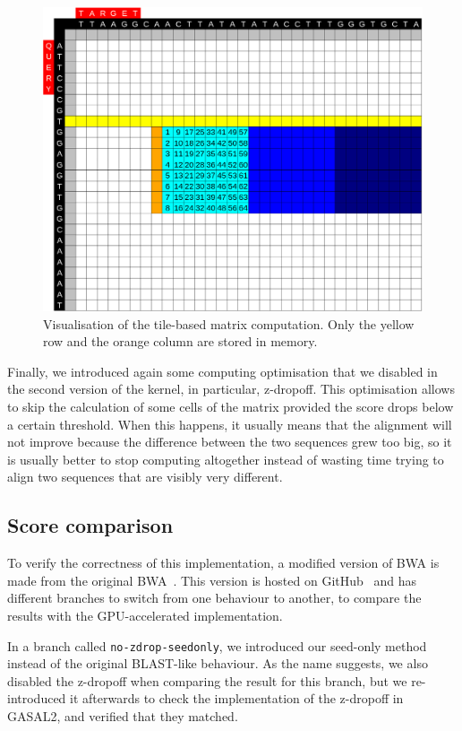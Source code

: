 \begin{figure}[h!]
	\centering
	\includegraphics[width=0.9\linewidth]{visualisation-aid-tile}
	\caption{Visualisation of the tile-based matrix computation. Only the yellow row and the orange column are stored in memory.}
	\label{fig:visualisation-aid-tile}
\end{figure}


Finally, we introduced again some computing optimisation that we disabled in the second version of the kernel, in particular, z-dropoff. This optimisation allows to skip the calculation of some cells of the matrix provided the score drops below a certain threshold. When this happens, it usually means that the alignment will not improve because the difference between the two sequences grew too big, so it is usually better to stop computing altogether instead of wasting time trying to align two sequences that are visibly very different.

\subsection{Score comparison}

To verify the correctness of this implementation, a modified version of BWA is made from the original BWA~\cite{lh3:bwa}. This version is hosted on GitHub~\cite{j-levy:bwa} and has different branches to switch from one behaviour to another, to compare the results with the GPU-accelerated implementation.

In a branch called \verb|no-zdrop-seedonly|, we introduced our seed-only method instead of the original BLAST-like behaviour. As the name suggests, we also disabled the z-dropoff when comparing the result for this branch, but we re-introduced it afterwards to check the implementation of the z-dropoff in GASAL2, and verified that they matched.

